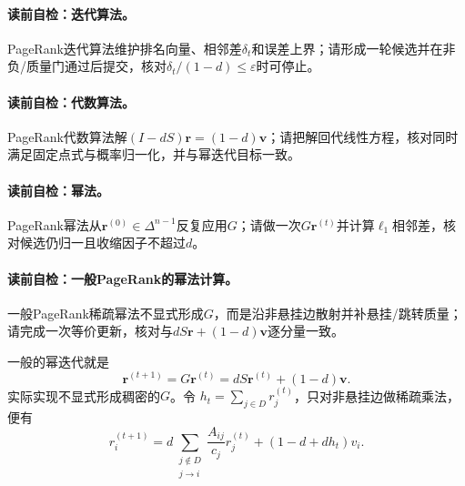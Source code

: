 \paragraph{读前自检：迭代算法。}PageRank迭代算法维护排名向量、相邻差$\delta_t$和误差上界；请形成一轮候选并在非负/质量门通过后提交，核对$\delta_t/(1-d)\le\varepsilon$时可停止。\par
\paragraph{读前自检：代数算法。}PageRank代数算法解$(I-dS)\boldsymbol r=(1-d)\boldsymbol v$；请把解回代线性方程，核对同时满足固定点式与概率归一化，并与幂迭代目标一致。\par
\paragraph{读前自检：幂法。}PageRank幂法从$\boldsymbol r^{(0)}\in\Delta^{n-1}$反复应用$G$；请做一次$G\boldsymbol r^{(t)}$并计算$\ell_1$相邻差，核对候选仍归一且收缩因子不超过$d$。\par
\paragraph{读前自检：一般PageRank的幂法计算。}一般PageRank稀疏幂法不显式形成$G$，而是沿非悬挂边散射并补悬挂/跳转质量；请完成一次等价更新，核对与$dS\boldsymbol r+(1-d)\boldsymbol v$逐分量一致。\par


一般\PageRank{}的幂迭代就是
\begin{equation}
\boldsymbol r^{(t+1)}=G\boldsymbol r^{(t)}
=dS\boldsymbol r^{(t)}+(1-d)\boldsymbol v.
\label{eq:V5-C07-power-update}
\end{equation}
实际实现不显式形成稠密的$G$。令
$h_t=\sum_{j\in D}r_j^{(t)}$，只对非悬挂边做稀疏乘法，便有
\begin{equation}
r_i^{(t+1)}
=d\sum_{\substack{j\notin D\\j\to i}}
\frac{A_{ij}}{c_j}r_j^{(t)}
+(1-d+dh_t)v_i.
\label{eq:V5-C07-sparse-update}
\end{equation}

